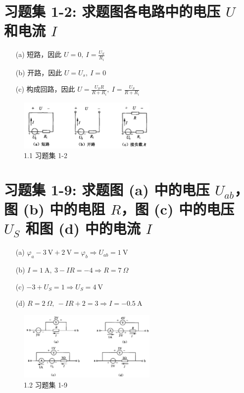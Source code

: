 \documentclass[UTF8]{report}
\theoremstyle{MyLineTheoremStyle} %
\theoremstyle{MyBlockTheoremStyle} %
\theoremstyle{MySubsubsectionStyle} %
\begin{document}
\section{习题集 1-2: 求题图各电路中的电压 $U$ 和电流 $I$}

\begin{enumerate}
\item[(a)] 短路，因此 $U = 0,\  I = \frac{U_S}{R_i}$
\item[(b)] 开路，因此 $U = U_s, \ I = 0$
\item[(c)] 构成回路，因此  $ U = \frac{U_SR}{R + R_i},\ I = \frac{U_S}{R + R_i}$ 
\end{enumerate}

\begin{figure}[H]\centering
\includegraphics[width=0.6\textwidth]{assets/1/ae1cfc03fad5c98bfff08a663714a004.png}
\caption{ 1.1 习题集 1-2}
\end{figure}

\section{习题集 1-9: 求题图 (a) 中的电压 $U_{ab}$，图 (b) 中的电阻 $R$，图 (c) 中的电压 $U_S$ 和图 (d) 中的电流 $I$}

\begin{enumerate}
    \item[(a)]  $ \varphi_a - 3\ \mathrm{V} + 2\ \mathrm{V} = \varphi_b \Longrightarrow U_{ab} = 1\ \mathrm{V} $ 
    \item[(b)] $I = 1\ \mathrm{A},\  3 -IR= -4 \Longrightarrow R = 7\ \Omega$ 
    \item[(c)] $-3 + U_S = 1 \Longrightarrow U_S = 4 \ \mathrm{V}$ 
    \item[(d)] $R=2\ \Omega,\ -IR + 2 = 3 \Longrightarrow I = -0.5\ \mathrm{A}$ 
\end{enumerate}

\begin{figure}[H]\centering
    \includegraphics[width=0.6\textwidth]{assets/1/d3d69ecd6b1c1bc476fd4a4957fb9e56.png}
\caption{ 1.2 习题集 1-9}
\end{figure}
\end{document}
